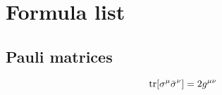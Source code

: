 \chapter{Formula list}

\section{Pauli matrices}

\begin{equation} \label{eq:pauli-matrices-1}
  \operatorname{tr}[\sigma^{\mu}\bar{\sigma}^{\nu}] = 2 g^{\mu\nu}
\end{equation}
